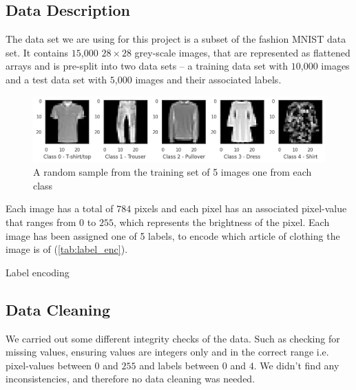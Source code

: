 \documentclass[../main.tex]{subfiles}
\begin{document}
\subsection{Data Description}

The data set we are using for this project is a subset of the 
fashion MNIST data set. It contains $15$,$000$ $28 \times 28$ 
grey-scale images, that are represented as flattened arrays and is 
pre-split into two data sets -- a training data set with $10$,$000$ 
images and a test data set with $5$,$000$ images and their 
associated labels. 

\begin{figure}[ht]
    \centering
    \includegraphics[width=\textwidth]
    {images/clothing_image_report.png}
    \caption{A random sample from the training set of 5 images one 
    from each class}
    \label{fig:clothes}
\end{figure}

Each image has a total of $784$ pixels and each pixel has an 
associated pixel-value that ranges from $0$ to $255$, which 
represents the brightness of the pixel. 
Each image has been assigned one of 5 labels, to encode which 
article of clothing the image is of (\autoref{tab:label_enc}).

\begin{table}[ht]
    \centering
    
    \caption{Label encoding}
    \label{tab:label_enc}
\end{table}


\subsection{Data Cleaning}

We carried out some different integrity checks of the data. Such as 
checking for missing values, ensuring values are integers only and 
in the correct range i.e. pixel-values between $0$ and $255$ and 
labels between $0$ and $4$. We didn't find any inconsistencies, and 
therefore no data cleaning was needed. 
\end{document}
